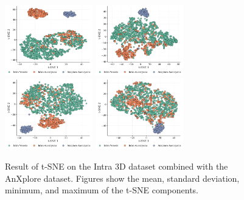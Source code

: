 \documentclass[%
 reprint,
 amsmath,amssymb,
 aps,
 floatfix,
 nofootinbib,
]{revtex4-2}
\begin{document}
\begin{figure}[h!]
  \centering
  \includegraphics[width=0.34\textwidth]{t-sne_mean.png}
  \includegraphics[width=0.34\textwidth]{t-sne_std.png}
  \includegraphics[width=0.34\textwidth]{t-sne_min.png}
  \includegraphics[width=0.34\textwidth]{t-sne_max.png}
  \caption{Result of t-SNE on the Intra 3D dataset combined with the AnXplore dataset. Figures show the mean, standard deviation, minimum, and maximum of the t-SNE components.}
  \label{fig:tsne_supplementary}
\end{figure}
\end{document}
